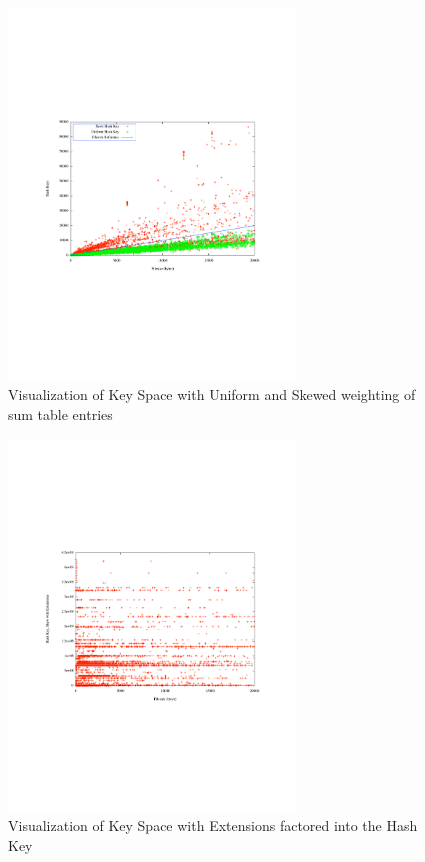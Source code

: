 \documentclass[10pt, twocolumn]{article}
\begin{document}
 \begin{figure}[h] 
 \centering
\includegraphics[width= 3in]{scatter_circles.pdf}
\caption{Visualization of Key Space with Uniform and Skewed weighting of sum table entries 
}
\label{scatterPoster} 
\end{figure}   

 \begin{figure}[h] 
 \centering
\includegraphics[width= 3in]{skewExtScatter.pdf}
\caption{Visualization of Key Space with Extensions factored into the Hash Key}
\label{scatterExtension} 
\end{figure}   
\end{document}
